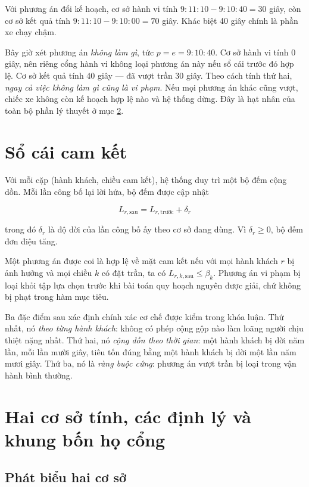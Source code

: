 Với phương án đổi kế hoạch, cơ sở hành vi tính $9{:}11{:}10 - 9{:}10{:}40 = 30$ giây, còn cơ sở
kết quả tính $9{:}11{:}10 - 9{:}10{:}00 = 70$ giây. Khác biệt 40 giây chính là phần xe chạy chậm.

Bây giờ xét phương án \emph{không làm gì}, tức $p = e = 9{:}10{:}40$. Cơ sở hành vi tính 0 giây,
nên riêng cổng hành vi không loại phương án này nếu sổ cái trước đó hợp lệ. Cơ sở kết quả tính 40 giây --- đã vượt trần 30 giây. Theo cách
tính thứ hai, \emph{ngay cả việc không làm gì cũng là vi phạm}. Nếu mọi phương án khác cũng vượt,
chiếc xe không còn kế hoạch hợp lệ nào và hệ thống dừng. Đây là hạt nhân của toàn bộ phần lý
thuyết ở mục \ref{muc:haicosotinh}.

\section{Sổ cái cam kết}

Với mỗi cặp (hành khách, chiều cam kết), hệ thống duy trì một bộ đếm cộng dồn. Mỗi lần công bố
lại lời hứa, bộ đếm được cập nhật

\begin{equation}
L_{r,\text{sau}} = L_{r,\text{trước}} + \delta_r
\end{equation}

trong đó $\delta_r$ là độ dời của lần công bố ấy theo cơ sở đang dùng. Vì $\delta_r \ge 0$, bộ
đếm đơn điệu tăng.

Một phương án được coi là hợp lệ về mặt cam kết nếu với mọi hành khách $r$ bị ảnh hưởng và mọi
chiều $k$ có đặt trần, ta có $L_{r,k,\text{sau}} \le \beta_k$. Phương án vi phạm bị loại khỏi
tập lựa chọn trước khi bài toán quy hoạch nguyên được giải, chứ không bị phạt trong hàm mục
tiêu.

Ba đặc điểm sau xác định chính xác cơ chế được kiểm trong khóa luận. Thứ
nhất, nó \emph{theo từng hành khách}: không có phép cộng gộp nào làm loãng người chịu thiệt
nặng nhất. Thứ hai, nó \emph{cộng dồn theo thời gian}: một hành khách bị dời năm lần, mỗi lần
mười giây, tiêu tốn đúng bằng một hành khách bị dời một lần năm mươi giây. Thứ ba, nó là
\emph{ràng buộc cứng}: phương án vượt trần bị loại trong vận hành bình thường.

\section{Hai cơ sở tính, các định lý và khung bốn họ cổng}
\label{muc:haicosotinh}

\subsection{Phát biểu hai cơ sở}

